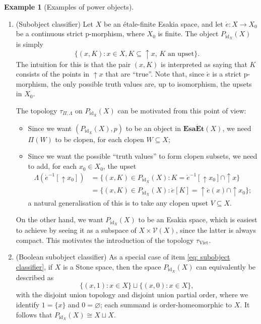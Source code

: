 \documentclass[12pt]{amsart}
\theoremstyle{plain}
\theoremstyle{definition}
\newtheorem{example}[theorem]{Example}
\newcommand{\cat}[1]{\mathbf{#1}}
\newcommand{\id}{\mathrm{id}}
\newcommand{\V}{\mathcal{V}}
\newcommand{\Viet}{\mathrm{Viet}}
\newcommand{\EsaEt}{\cat{Esa\acute{E}t}}
\renewcommand{\u}{{\uparrow}}
\begin{document}
\begin{example}[Examples of power objects] \hfill
    \begin{enumerate}
        \item \label{eq: subobject classifier}
        (Subobject classifier) Let $X$ be an étale-finite Esakia space, and let $\acute{e}\colon  X\to X_{0}$ be a continuous strict p-morphism, where $X_{0}$ is finite. 
        The object $P_{\id_{X}}(X)$ is simply
        \begin{equation*}
            \{(x,K) : x\in X, K\subseteq {\u}x,\, K \text{ an upset} \}.
        \end{equation*}
        The intuition for this is that the pair $(x,K)$ is interpreted as saying that $K$ consists of the points in $\u x$ that are ``true''. Note that, since $\acute{e}$ is a strict p-morphism, the only possible truth values are, up to isomorphism, the upsets in $X_{0}$.
        
        The topology $\tau_{\Pi,\Lambda}$ on $P_{\id_{X}}(X)$ can be motivated from this point of view:
        \begin{itemize}
            \item 
            Since we want $(P_{\id_{X}}(X),p)$ to be an object in $\EsaEt(X)$, we need $\Pi(W)$ to be clopen, for each clopen $W\subseteq X$;
            \item 
            Since we want the possible ``truth values'' to form clopen subsets, we need to add, for each $x_{0}\in X_{0}$, the upset
            \begin{align*}
                \Lambda(\acute{e}^{-1}[{\u}x_{0}]) &= \{(x,K) \in P_{\id_X}(X) : K=\acute{e}^{-1}[{\u}x_{0}]\cap {\u}x\}\\
                &=\{(x,K) \in P_{\id_X}(X) : \acute{e}[K]={\u}\acute{e}(x)\cap {\u}x_{0}\};
            \end{align*}
            a natural generalisation of this is to take any clopen upset $V\subseteq X$.
        \end{itemize}
        On the other hand, we want $P_{\id_{X}}(X)$ to be an Esakia space, which is easiest to achieve by seeing it as a subspace of $X\times \V(X)$, since the latter is always compact. This motivates the introduction of the topology $\tau_{\Viet}$.
    
        \item (Boolean subobject classifier)
        As a special case of item \eqref{eq: subobject classifier}, if $X$ is a Stone space, then the space $P_{\id_{X}}(X)$ can equivalently be described as
        \begin{equation*}
            \{(x,1) : x\in X\}\sqcup \{(x,0) : x\in X\},
        \end{equation*}
        with the disjoint union topology and disjoint union partial order,
        where we identify $1=\{x\}$ and $0=\varnothing$; each summand is order-homeomorphic to $X$.
        It follows that $P_{\id_{X}}(X)\cong X\sqcup X$.
    \end{enumerate}
     
\end{example}
\end{document}
